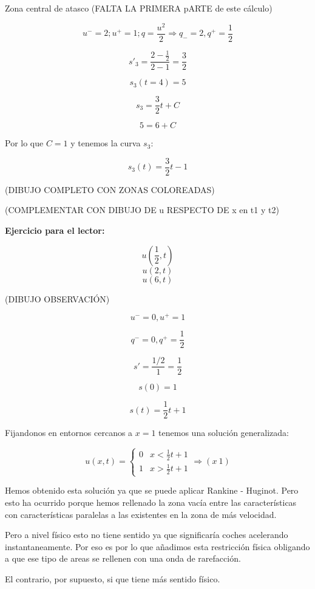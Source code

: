\begin{example}{Zona central de atasco}
			(FALTA LA PRIMERA pARTE de este cálculo)

			$$u^{-} = 2 ; u^{+} = 1; q = \frac{u^2}{2} \Rightarrow q_{-} = 2, q^{+} = \frac{1}{2}$$

			$$s'_3 = \frac{2 - \frac{1}{2}}{2 - 1} = \frac{3}{2}$$

			$$s_3 (t = 4) = 5$$

			$$s_3 = \frac{3}{2}t + C$$

			$$5 = 6 + C$$

			Por lo que $C = 1$ y tenemos la curva $s_3$:

			$$s_3(t) = \frac{3}{2} t - 1$$

			(DIBUJO COMPLETO CON ZONAS COLOREADAS)

			(COMPLEMENTAR CON DIBUJO DE u RESPECTO DE x en t1 y t2)


			\textbf{Ejercicio para el lector:}

			$$u(\frac{1}{2},t)$$
			$$u(2,t)$$
			$$u(6,t)$$


		\end{example}

		\obs

		(DIBUJO OBSERVACIÓN)

		$$u^{-} = 0, u^+ = 1$$

		$$q^{-} = 0, q^+ = \frac{1}{2}$$

		$$s' = \frac{1/2}{1} = \frac{1}{2}$$

		$$s(0) = 1$$

		$$s(t) = \frac{1}{2}t + 1$$

		Fijandonos en entornos cercanos a $x=1$ tenemos una solución generalizada:

		$$u(x,t) =
		\begin{cases}
			0 & x < \frac{1}{2} t + 1 \\
			1 & x > \frac{1}{2} t + 1
		\end{cases} \Rightarrow (x ~ 1)$$


		Hemos obtenido esta solución ya que se puede aplicar Rankine - Huginot. Pero esto ha ocurrido porque hemos rellenado la zona vacía entre las características con características paralelas a las existentes en la zona de más velocidad.

		Pero a nivel físico esto no tiene sentido ya que significaría coches acelerando instantaneamente. Por eso es por lo que añadimos esta restricción física obligando a que ese tipo de areas se rellenen con una onda de rarefacción.

		El contrario, por supuesto, si que tiene más sentido físico.

